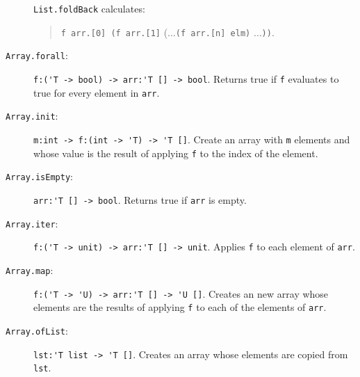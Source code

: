 \begin{description}
  \lstinline{List.foldBack} calculates:
  \begin{quote}
    \lstinline{f arr.[0] (f arr.[1]} ($\ldots$\lstinline{(f arr.[n] elm)} $\ldots$\lstinline{))}.
  \end{quote}
\item[\texttt{Array.forall}:] \lstinline{f:('T -> bool) -> arr:'T [] -> bool}. Returns true if \lstinline{f} evaluates to true for every element in \lstinline{arr}.
\item[\texttt{Array.init}:] \lstinline{m:int -> f:(int -> 'T) -> 'T []}. Create an array with \lstinline{m} elements and whose value is the result of applying \lstinline{f} to the index of the element.
\item[\texttt{Array.isEmpty}:] \lstinline{arr:'T [] -> bool}. Returns true if \lstinline{arr} is empty.
\item[\texttt{Array.iter}:] \lstinline{f:('T -> unit) -> arr:'T [] -> unit}. Applies \lstinline{f} to each element of \lstinline{arr}.
\item[\texttt{Array.map}:] \lstinline{f:('T -> 'U) -> arr:'T [] -> 'U []}. Creates an new array whose elements are the results of applying \lstinline{f} to each of the elements of \lstinline{arr}.
\item[\texttt{Array.ofList}:] \lstinline{lst:'T list -> 'T []}. Creates an array whose elements are copied from \lstinline{lst}.

\end{description}
